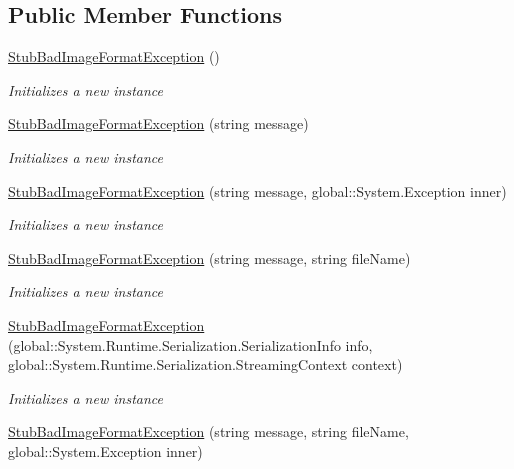 \subsection*{Public Member Functions}
\begin{DoxyCompactItemize}
\item 
\hyperlink{class_system_1_1_fakes_1_1_stub_bad_image_format_exception_a5b7261713017c301cccbcddff2181b98}{Stub\-Bad\-Image\-Format\-Exception} ()
\begin{DoxyCompactList}\small\item\em Initializes a new instance\end{DoxyCompactList}\item 
\hyperlink{class_system_1_1_fakes_1_1_stub_bad_image_format_exception_aa750410fa5645eb833baca8a9fad904a}{Stub\-Bad\-Image\-Format\-Exception} (string message)
\begin{DoxyCompactList}\small\item\em Initializes a new instance\end{DoxyCompactList}\item 
\hyperlink{class_system_1_1_fakes_1_1_stub_bad_image_format_exception_ae58ecc60b79e2d1a7820d59cc9981cbb}{Stub\-Bad\-Image\-Format\-Exception} (string message, global\-::\-System.\-Exception inner)
\begin{DoxyCompactList}\small\item\em Initializes a new instance\end{DoxyCompactList}\item 
\hyperlink{class_system_1_1_fakes_1_1_stub_bad_image_format_exception_a1af729877c39fd6cfbf7e913b9755f0b}{Stub\-Bad\-Image\-Format\-Exception} (string message, string file\-Name)
\begin{DoxyCompactList}\small\item\em Initializes a new instance\end{DoxyCompactList}\item 
\hyperlink{class_system_1_1_fakes_1_1_stub_bad_image_format_exception_afa0a5b4cd953cc68fadceaa8ce98c5b3}{Stub\-Bad\-Image\-Format\-Exception} (global\-::\-System.\-Runtime.\-Serialization.\-Serialization\-Info info, global\-::\-System.\-Runtime.\-Serialization.\-Streaming\-Context context)
\begin{DoxyCompactList}\small\item\em Initializes a new instance\end{DoxyCompactList}\item 
\hyperlink{class_system_1_1_fakes_1_1_stub_bad_image_format_exception_ae9cb762da7bcb5940c9fb93cd6e1e700}{Stub\-Bad\-Image\-Format\-Exception} (string message, string file\-Name, global\-::\-System.\-Exception inner)

\end{DoxyCompactItemize}
